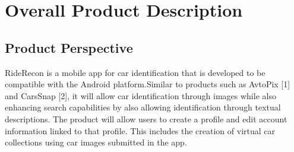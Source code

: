 \documentclass[]{article}
\begin{document}
\section{Overall Product Description}
\label{sec:overall_description}

\subsection{Product Perspective}
\label{sub:product_perspective}

RideRecon is a mobile app for car identification that is developed to be compatible with the Android platform.Similar to products such as AvtoPix [1] and CarsSnap [2], it will allow car identification through images while also enhancing search capabilities by also allowing identification through textual descriptions. The product will allow users to create a profile and edit account information linked to that profile. This includes the creation of virtual car collections using car images submitted in the app.
\end{document}
